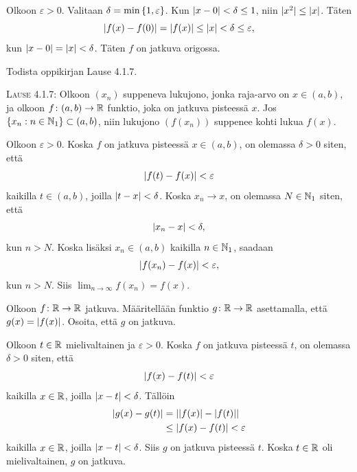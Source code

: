 \documentclass[11pt,a4paper]{amsart}
\begin{document}
\begin{solution}
  Olkoon \(\varepsilon > 0\). Valitaan \(\delta = \minset{1, \varepsilon}\).
  Kun \(\abs{x - 0} < \delta \leq 1\), niin \(\abs{x^2} \leq \abs{x}\).
  Täten
  \[
    \abs{f(x) - f(0)} = \abs{f(x)} \leq \abs{x} < \delta \leq \varepsilon,
  \]
  kun \(\abs{x - 0} = \abs{x} < \delta\). Täten \(f\) on jatkuva origossa.
\end{solution}

\begin{exercise}
  Todista oppikirjan Lause 4.1.7.

  \medskip
  \noindent\textsc{Lause 4.1.7:} Olkoon \((x_n)\) suppeneva lukujono, jonka
  raja-arvo on \(x \in (a,b)\), ja olkoon \(f\colon (a,b) \to \RR\)
  funktio, joka on jatkuva pisteessä \(x\). Jos
  \(\{x_n : n \in \NNone\} \subset (a,b)\), niin lukujono \((f(x_n))\)
  suppenee kohti lukua \(f(x)\).
\end{exercise}

\begin{solution}
  Olkoon \(\varepsilon > 0\). Koska \(f\) on jatkuva pisteessä \(x \in (a, b)\),
  on olemassa \(\delta > 0\) siten, että
  \[
    \abs{f(t) - f(x)} < \varepsilon
  \]
  kaikilla \(t \in (a, b)\), joilla \(\abs{t - x} < \delta\).
  Koska \(x_n \to x\), on olemassa \(N \in \NNone\) siten, että
  \[
    \abs{x_n - x} < \delta,
  \]
  kun \(n > N\). Koska lisäksi \(x_n \in (a, b)\) kaikilla \(n \in
  \NNone\), saadaan
  \[
    \abs{f(x_n) - f(x)} < \varepsilon,
  \]
  kun \(n > N\). Siis \(\lim_{n \to \infty} f(x_n) = f(x)\).
\end{solution}

\begin{exercise}
  Olkoon \(f\colon \RR \to \RR\) jatkuva.
  Määritellään funktio \(g\colon \RR \to \RR\) asettamalla, että
  \(g(x) = \abs{f(x)}\). Osoita, että \(g\) on jatkuva.
\end{exercise}

\begin{solution}
  Olkoon \(t \in \RR\) mielivaltainen ja \(\varepsilon > 0\).
  Koska \(f\) on jatkuva pisteessä \(t\), on olemassa \(\delta > 0\) siten, että
  \[
    \abs{f(x) - f(t)} < \varepsilon
  \]
  kaikilla \(x \in \RR\), joilla \(\abs{x - t} < \delta\).
  Tällöin
  \[
    \begin{aligned}
      \abs{g(x) - g(t)} &= \abs*{\abs{f(x)} - \abs{f(t)}} \\
      &\leq \abs{f(x) - f(t)} < \varepsilon
    \end{aligned}
  \]
  kaikilla \(x \in \RR\), joilla \(\abs{x - t} < \delta\).
  Siis \(g\) on jatkuva pisteessä \(t\). Koska \(t \in \RR\) oli mielivaltainen,
  \(g\) on jatkuva.
\end{solution}
\end{document}
